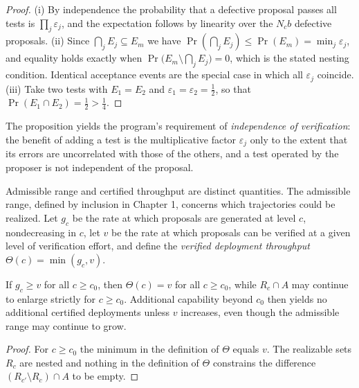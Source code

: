 \begin{proof}
(i) By independence the probability that a defective proposal passes all tests is $\prod_j\varepsilon_j$, and the expectation follows by linearity over the $N_cb$ defective proposals. (ii) Since $\bigcap_jE_j\subseteq E_m$ we have $\Pr(\bigcap_jE_j)\le\Pr(E_m)=\min_j\varepsilon_j$, and equality holds exactly when $\Pr\big(E_m\setminus\bigcap_jE_j\big)=0$, which is the stated nesting condition. Identical acceptance events are the special case in which all $\varepsilon_j$ coincide. (iii) Take two tests with $E_1=E_2$ and $\varepsilon_1=\varepsilon_2=\tfrac12$, so that $\Pr(E_1\cap E_2)=\tfrac12>\tfrac14$.
\end{proof}

The proposition yields the program's requirement of \emph{independence of verification}: the benefit of adding a test is the multiplicative factor $\varepsilon_j$ only to the extent that its errors are uncorrelated with those of the others, and a test operated by the proposer is not independent of the proposal.

Admissible range and certified throughput are distinct quantities. The admissible range, defined by inclusion in Chapter 1, concerns which trajectories could be realized. Let $g_c$ be the rate at which proposals are generated at level $c$, nondecreasing in $c$, let $v$ be the rate at which proposals can be verified at a given level of verification effort, and define the \emph{verified deployment throughput} $\Theta(c)=\min(g_c,v)$.

\begin{proposition}
If $g_c\ge v$ for all $c\ge c_0$, then $\Theta(c)=v$ for all $c\ge c_0$, while $R_c\cap A$ may continue to enlarge strictly for $c\ge c_0$. Additional capability beyond $c_0$ then yields no additional certified deployments unless $v$ increases, even though the admissible range may continue to grow.
\end{proposition}

\begin{proof}
For $c\ge c_0$ the minimum in the definition of $\Theta$ equals $v$. The realizable sets $R_c$ are nested and nothing in the definition of $\Theta$ constrains the difference $(R_{c'}\setminus R_c)\cap A$ to be empty.
\end{proof}
